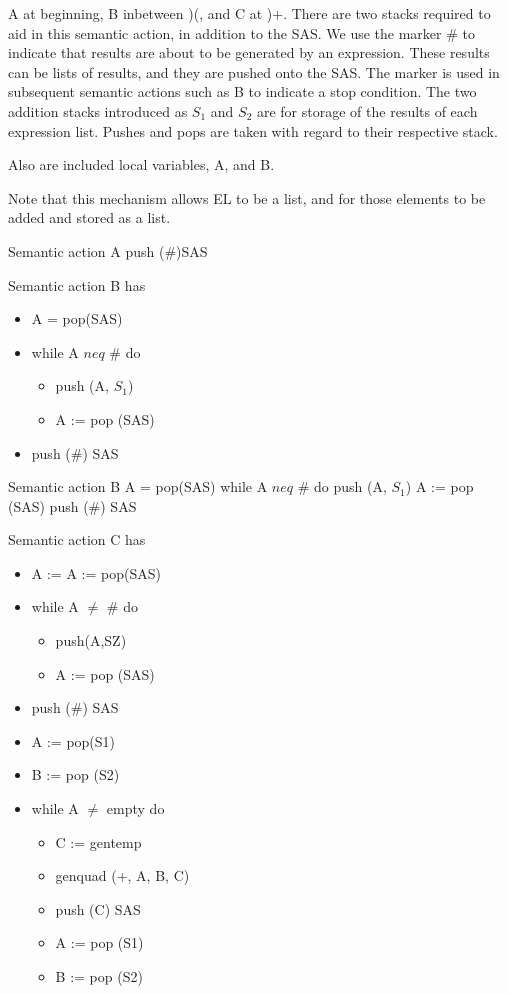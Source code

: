\documentclass[11pt]{article}
\begin{document}
 A at beginning, B inbetween )(, and C at )+.  There are two stacks required to aid in this semantic action, in addition to the SAS.   We use the marker \# to indicate that results are about to be generated by an expression.  These results can be lists of results, and they are pushed onto the SAS.   The marker is used in subsequent semantic actions such as B to indicate a stop condition.  The two addition stacks introduced as $S_1$ and $S_2$ are for storage of the results of each expression list.   Pushes and pops are taken with regard to their respective stack.  
 
 Also are included local variables, A, and B.  
 
 Note that this mechanism allows EL to be a list, and for those elements to be added and stored as a list.  
 
 Semantic action A 
 	push (\#)SAS
 
 Semantic action B has
 \begin{itemize}
\item A = pop(SAS)
\item   while A $neq$ \# do 
 \begin{itemize}
\item  push (A, $S_1$)
\item A := pop (SAS)
\end{itemize}
\item push (\#) SAS
\end{itemize}

 Semantic action B 
	A = pop(SAS)
	while A $neq$ \# do 
		push (A, $S_1$)
		A := pop (SAS)
	push (\#) SAS

Semantic action C has 
\begin{itemize}
\item A := A := pop(SAS)
\item while A $\neq$ \# do
\begin{itemize}
\item push(A,SZ)
\item A := pop (SAS)
\end{itemize}
\item push (\#) SAS
\item A := pop(S1)
\item B := pop (S2)
\item while A $\neq$ empty do
\begin{itemize}
\item C := gentemp
\item genquad (+, A, B, C)
\item push (C) SAS
\item A := pop (S1)
\item B := pop (S2)
\end{itemize}

\end{itemize}
\end{document}
